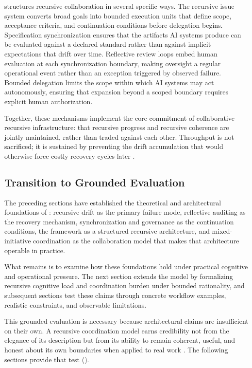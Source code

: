  structures recursive collaboration in several specific ways. The recursive issue system converts broad goals into bounded execution units that define scope, acceptance criteria, and continuation conditions before delegation begins. Specification synchronization ensures that the artifacts AI systems produce can be evaluated against a declared standard rather than against implicit expectations that drift over time. Reflective review loops embed human evaluation at each synchronization boundary, making oversight a regular operational event rather than an exception triggered by observed failure. Bounded delegation limits the scope within which AI systems may act autonomously, ensuring that expansion beyond a scoped boundary requires explicit human authorization.

Together, these mechanisms implement the core commitment of collaborative recursive infrastructure: that recursive progress and recursive coherence are jointly maintained, rather than traded against each other. Throughput is not sacrificed; it is sustained by preventing the drift accumulation that would otherwise force costly recovery cycles later \cite{Brooks1987NoSilverBullet,Beer1972BrainFirm}.

\subsection{Transition to Grounded Evaluation}

The preceding sections have established the theoretical and architectural foundations of : recursive drift as the primary failure mode, reflective auditing as the recovery mechanism, synchronization and governance as the continuation conditions, the  framework as a structured recursive architecture, and mixed-initiative coordination as the collaboration model that makes that architecture operable in practice.

What remains is to examine how these foundations hold under practical cognitive and operational pressure. The next section extends the model by formalizing recursive cognitive load and coordination burden under bounded rationality, and subsequent sections test these claims through concrete workflow examples, realistic constraints, and observable limitations.

This grounded evaluation is necessary because architectural claims are insufficient on their own. A recursive coordination model earns credibility not from the elegance of its description but from its ability to remain coherent, useful, and honest about its own boundaries when applied to real work \cite{Simon1957ModelsMan,Shneiderman2020HCAI}. The following sections provide that test ().
